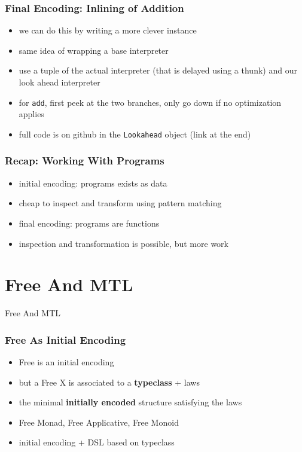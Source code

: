 \documentclass[aspectratio=169, hyperref={colorlinks, linkcolor=beamer@centricgreen}, urlcolor=links]{beamer}
\begin{document}
\begin{frame}
  \frametitle{Final Encoding: Inlining of Addition}
  \begin{itemize}
  \item we can do this by writing a more clever instance
  \item same idea of wrapping a base interpreter
  \item use a tuple of the actual interpreter (that is delayed using a
    thunk) and our look ahead interpreter
  \item for \texttt{add}, first peek at the two branches, only go down if no optimization applies
  \item full code is on github in the \texttt{Lookahead} object (link at the end)
  \end{itemize}
\end{frame}

\begin{frame}
  \frametitle{Recap: Working With Programs}
  \begin{itemize}
  \item initial encoding: programs exists as data
  \item cheap to inspect and transform using pattern matching
  \item final encoding: programs are functions
  \item inspection and transformation is possible, but more work
  \end{itemize}
\end{frame}

\section{Free And MTL}\label{sec:free-and-mtl}

\begin{frame}
  \begin{center}
    \Huge
    Free And MTL
  \end{center}
\end{frame}

\begin{frame}
  \frametitle{Free As Initial Encoding}
  \begin{itemize}
  \item Free is an initial encoding
  \item but a Free X is associated to a \textbf{typeclass} + laws
  \item the minimal \textbf{initially encoded} structure satisfying
    the laws
  \item Free Monad, Free Applicative, Free Monoid
  \item initial encoding + DSL based on typeclass
  \end{itemize}
\end{frame}
\end{document}
